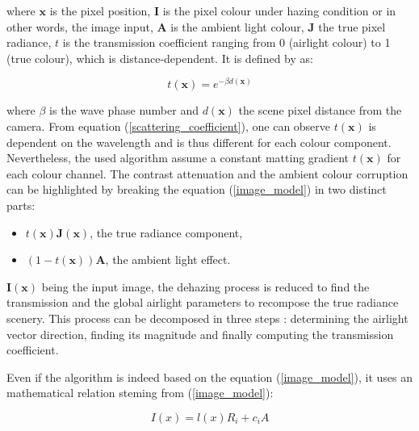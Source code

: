 \documentclass[conference]{IEEEtran}
\begin{document}
where $\mathbf{x}$ is the pixel position, $\mathbf{I}$ is the pixel colour under hazing condition or in other words, the image input, $\mathbf{A}$ is the ambient light colour,
$\mathbf{J}$ the true pixel radiance, $t$ is the transmission coefficient ranging from 0 (airlight colour)
to 1 (true colour), which is distance-dependent. It is defined by \cite{b2} as:

\begin{equation}
\label{scattering_coefficient}
t(\mathbf{x}) = e^{-\beta d(\mathbf{x})}
\end{equation}

where $\beta$ is the wave phase number and $d(\textbf{x})$ the scene pixel distance from the camera.  From equation (\ref{scattering_coefficient}),
one can observe $t(\mathbf{x})$ is dependent on the wavelength and is thus different for each colour component.  Nevertheless, the used algorithm assume a constant matting gradient $t(\mathbf{x})$ for each colour channel.
The contrast attenuation and the ambient colour corruption can be highlighted by breaking the equation (\ref{image_model}) in two distinct parts: 
\begin{itemize}
    \item $t(\mathbf{x}) \mathbf{J}(\mathbf{x})$, the true radiance component,
    \item $(1-t(\mathbf{x})) \mathbf{A}$, the ambient light effect.
\end{itemize}
$\mathbf{I}(\mathbf{x})$ being the input image, the dehazing process is reduced to find the transmission and the global airlight parameters to recompose
the true radiance scenery.  This process can be decomposed in three steps : determining the airlight vector direction, finding its magnitude and finally computing the transmission coefficient.
  
Even if the algorithm is indeed based on the equation (\ref{image_model}), it uses an mathematical relation steming from (\ref{image_model}):

 \begin{equation}
\label{shading_coefficient}
I(x) = l(x) R_i + c_i A
\end{equation}
\end{document}
